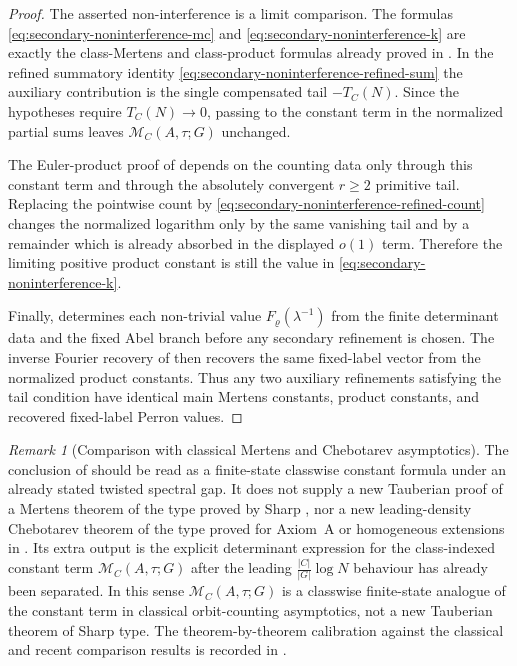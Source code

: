 \documentclass[11pt,a4paper]{amsart}
\theoremstyle{plain}
\theoremstyle{definition}
\theoremstyle{remark}
\newtheorem{remark}[theorem]{Remark}
\begin{document}
\begin{proof}
  The asserted non-interference is a limit comparison.  The formulas
  \eqref{eq:secondary-noninterference-mc} and
  \eqref{eq:secondary-noninterference-k} are exactly the class-Mertens and
  class-product formulas already proved in
  .  In the
  refined summatory identity \eqref{eq:secondary-noninterference-refined-sum}
  the auxiliary contribution is the single compensated tail \(-T_C(N)\).
  Since the hypotheses require \(T_C(N)\to0\), passing to the constant term
  in the normalized partial sums leaves \(\mathcal M_C(A,\tau;G)\) unchanged.

  The Euler-product proof of  depends
  on the counting data only through this constant term and through the
  absolutely convergent \(r\ge2\) primitive tail.  Replacing the pointwise
  count by \eqref{eq:secondary-noninterference-refined-count} changes the
  normalized logarithm only by the same vanishing tail and by a remainder
  which is already absorbed in the displayed \(o(1)\) term.  Therefore the
  limiting positive product constant is still the value in
  \eqref{eq:secondary-noninterference-k}.

  Finally,  determines each
  non-trivial value \(F_\varrho(\lambda^{-1})\) from the finite determinant
  data and the fixed Abel branch before any secondary refinement is chosen.
  The inverse Fourier recovery of
   then recovers the same
  fixed-label vector from the normalized product constants.  Thus any two
  auxiliary refinements satisfying the tail condition have identical main
  Mertens constants, product constants, and recovered fixed-label Perron
  values.
\end{proof}

\begin{remark}[Comparison with classical Mertens and Chebotarev
  asymptotics]
  \label{rem:class-mertens-comparison}
  The conclusion of  should be read as
  a finite-state classwise constant formula under an already stated
  twisted spectral gap. It does not supply a new Tauberian proof of a
  Mertens theorem of the type proved by Sharp
  \cite{Sharp1991Mertens}, nor a new leading-density Chebotarev theorem
  of the type proved for Axiom~A or homogeneous extensions in
  \cite{ParryPollicott1986Chebotarev,NooraniParry1992ChebotarevShifts}.
  Its extra output is the explicit determinant expression for the
  class-indexed constant term \(\mathcal M_C(A,\tau;G)\) after the leading
  \(\frac{|C|}{|G|}\log N\) behaviour has already been separated. In
  this sense \(\mathcal M_C(A,\tau;G)\) is a classwise finite-state
  analogue of the constant term in classical orbit-counting asymptotics,
  not a new Tauberian theorem of Sharp type.  The theorem-by-theorem
  calibration against the classical and recent comparison results is recorded
  in .
\end{remark}
\end{document}
